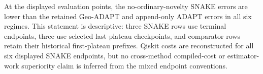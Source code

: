 \documentclass[
  reprint,
  amsmath,
  amssymb,
  aps,
  pra,
  nofootinbib,
  superscriptaddress,
  floatfix
]{revtex4-2}
\begin{document}
\begin{minipage}{\textwidth}
\begin{center}
\label{fig:hh_main_results_composite}
\end{center}
\end{minipage}
\clearpage
\twocolumngrid
\par\addvspace{0.45ex}
At the displayed evaluation points, the no-ordinary-novelty SNAKE errors are
lower than the retained Geo-ADAPT and append-only ADAPT errors in all six
regimes. This statement is descriptive: three SNAKE rows use terminal endpoints,
three use selected last-plateau checkpoints, and comparator rows retain their
historical first-plateau prefixes. Qiskit costs are reconstructed for all six
displayed SNAKE endpoints, but no cross-method compiled-cost or
estimator-work superiority claim is inferred from the mixed endpoint conventions.
\par\addvspace{1.0ex}
\par\addvspace{1.0ex}
\end{document}
